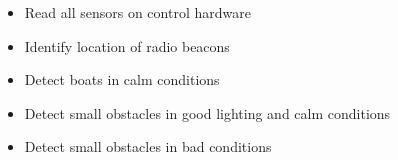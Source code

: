 \begin{itemize}
\item Read all sensors on control hardware
\item Identify location of radio beacons
\item Detect boats in calm conditions
\item Detect small obstacles in good lighting and calm conditions
\item Detect small obstacles in bad conditions
\end{itemize}